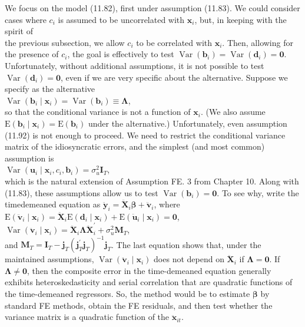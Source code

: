 \documentclass[10pt]{article}
\begin{document}
We focus on the model (11.82), first under assumption (11.83). We could consider cases where $c_{i}$ is assumed to be uncorrelated with $\mathbf{x}_{i}$, but, in keeping with the spirit of\\
the previous subsection, we allow $c_{i}$ to be correlated with $\mathbf{x}_{i}$. Then, allowing for the presence of $c_{i}$, the goal is effectively to test $\operatorname{Var}\left(\mathbf{b}_{i}\right)=\operatorname{Var}\left(\mathbf{d}_{i}\right)=\mathbf{0}$. Unfortunately, without additional assumptions, it is not possible to test $\operatorname{Var}\left(\mathbf{d}_{i}\right)=\mathbf{0}$, even if we are very specific about the alternative. Suppose we specify as the alternative\\
$\operatorname{Var}\left(\mathbf{b}_{i} \mid \mathbf{x}_{i}\right)=\operatorname{Var}\left(\mathbf{b}_{i}\right) \equiv \boldsymbol{\Lambda}$,\\
so that the conditional variance is not a function of $\mathbf{x}_{i}$. (We also assume $\mathrm{E}\left(\mathbf{b}_{i} \mid \mathbf{x}_{i}\right)= \mathrm{E}\left(\mathbf{b}_{i}\right)$ under the alternative.) Unfortunately, even assumption (11.92) is not enough to proceed. We need to restrict the conditional variance matrix of the idiosyncratic errors, and the simplest (and most common) assumption is\\
$\operatorname{Var}\left(\mathbf{u}_{i} \mid \mathbf{x}_{i}, c_{i}, \mathbf{b}_{i}\right)=\sigma_{u}^{2} \mathbf{I}_{T}$,\\
which is the natural extension of Assumption FE. 3 from Chapter 10. Along with (11.83), these assumptions allow us to test $\operatorname{Var}\left(\mathbf{b}_{i}\right)=\mathbf{0}$. To see why, write the timedemeaned equation as $\ddot{\mathbf{y}}_{i}=\ddot{\mathbf{X}}_{i} \boldsymbol{\beta}+\ddot{\mathbf{v}}_{i}$, where\\
$\mathrm{E}\left(\ddot{\mathbf{v}}_{i} \mid \mathbf{x}_{i}\right)=\ddot{\mathbf{X}}_{i} \mathrm{E}\left(\mathbf{d}_{i} \mid \mathbf{x}_{i}\right)+\mathrm{E}\left(\ddot{\mathbf{u}}_{i} \mid \mathbf{x}_{i}\right)=\mathbf{0}$,\\
$\operatorname{Var}\left(\ddot{\mathbf{v}}_{i} \mid \mathbf{x}_{i}\right)=\ddot{\mathbf{X}}_{i} \boldsymbol{\Lambda} \ddot{\mathbf{X}}_{i}^{\prime}+\sigma_{u}^{2} \mathbf{M}_{T}$,\\
and $\mathbf{M}_{T}=\mathbf{I}_{T}-\mathbf{j}_{T}\left(\mathbf{j}_{T}^{\prime} \mathbf{j}_{T}\right)^{-1} \mathbf{j}_{T}$. The last equation shows that, under the maintained assumptions, $\operatorname{Var}\left(\ddot{\mathbf{v}}_{i} \mid \mathbf{x}_{i}\right)$ does not depend on $\ddot{\mathbf{X}}_{i}$ if $\boldsymbol{\Lambda}=\mathbf{0}$. If $\boldsymbol{\Lambda} \neq \mathbf{0}$, then the composite error in the time-demeaned equation generally exhibits heteroskedasticity and serial correlation that are quadratic functions of the time-demeaned regressors. So, the method would be to estimate $\boldsymbol{\beta}$ by standard FE methods, obtain the FE residuals, and then test whether the variance matrix is a quadratic function of the $\ddot{\mathbf{x}}_{i t}$.
\end{document}
